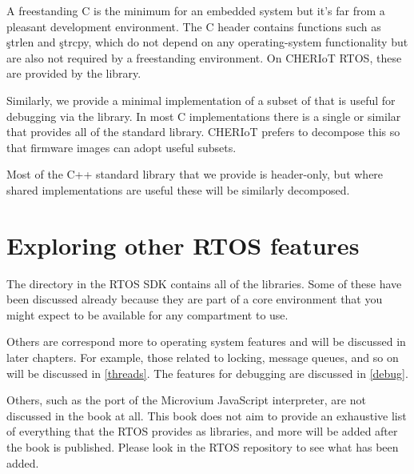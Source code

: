 A freestanding C is the minimum for an embedded system but it's far from a pleasant development environment.
The C  header contains functions such as \c{strlen} and \c{strcpy}, which do not depend on any operating-system functionality but are also not required by a freestanding environment.
On CHERIoT RTOS, these are provided by the  library.

Similarly, we provide a minimal implementation of a subset of  that is useful for debugging via the  library.
In most C implementations there is a single  or similar that provides all of the standard library.
CHERIoT prefers to decompose this so that firmware images can adopt useful subsets.

Most of the C++ standard library that we provide is header-only, but where shared implementations are useful these will be similarly decomposed.

\section{Exploring other RTOS features}

The  directory in the RTOS SDK contains all of the libraries.
Some of these have been discussed already because they are part of a core environment that you might expect to be available for any compartment to use.

Others are correspond more to operating system features and will be discussed in later chapters.
For example, those related to locking, message queues, and so on will be discussed in \ref{threads}.
The features for debugging are discussed in \ref{debug}.

Others, such as the port of the Microvium JavaScript interpreter, are not discussed in the book at all.
This book does not aim to provide an exhaustive list of everything that the RTOS provides as libraries, and more will be added after the book is published.
Please look in the RTOS repository to see what has been added.
